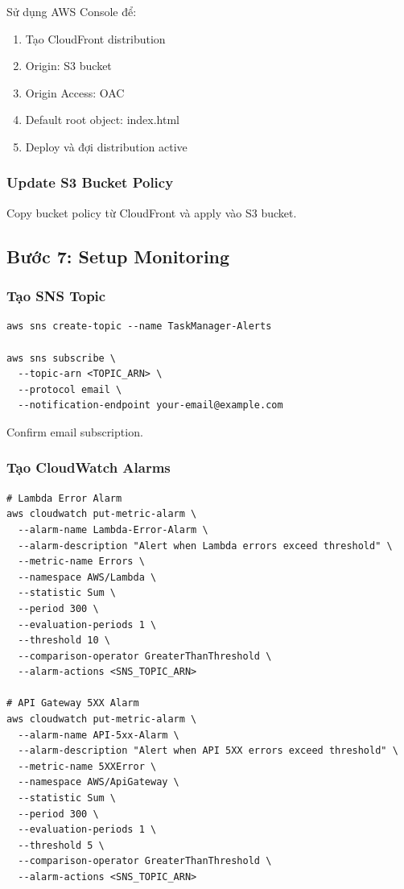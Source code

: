 Sử dụng AWS Console để:
\begin{enumerate}
    \item Tạo CloudFront distribution
    \item Origin: S3 bucket
    \item Origin Access: OAC
    \item Default root object: index.html
    \item Deploy và đợi distribution active
\end{enumerate}

\subsubsection{Update S3 Bucket Policy}

Copy bucket policy từ CloudFront và apply vào S3 bucket.

\subsection{Bước 7: Setup Monitoring}
\label{ssec:deploy_monitoring}

\subsubsection{Tạo SNS Topic}

\begin{verbatim}
aws sns create-topic --name TaskManager-Alerts

aws sns subscribe \
  --topic-arn <TOPIC_ARN> \
  --protocol email \
  --notification-endpoint your-email@example.com
\end{verbatim}

Confirm email subscription.

\subsubsection{Tạo CloudWatch Alarms}

\begin{verbatim}
# Lambda Error Alarm
aws cloudwatch put-metric-alarm \
  --alarm-name Lambda-Error-Alarm \
  --alarm-description "Alert when Lambda errors exceed threshold" \
  --metric-name Errors \
  --namespace AWS/Lambda \
  --statistic Sum \
  --period 300 \
  --evaluation-periods 1 \
  --threshold 10 \
  --comparison-operator GreaterThanThreshold \
  --alarm-actions <SNS_TOPIC_ARN>

# API Gateway 5XX Alarm
aws cloudwatch put-metric-alarm \
  --alarm-name API-5xx-Alarm \
  --alarm-description "Alert when API 5XX errors exceed threshold" \
  --metric-name 5XXError \
  --namespace AWS/ApiGateway \
  --statistic Sum \
  --period 300 \
  --evaluation-periods 1 \
  --threshold 5 \
  --comparison-operator GreaterThanThreshold \
  --alarm-actions <SNS_TOPIC_ARN>
\end{verbatim}

